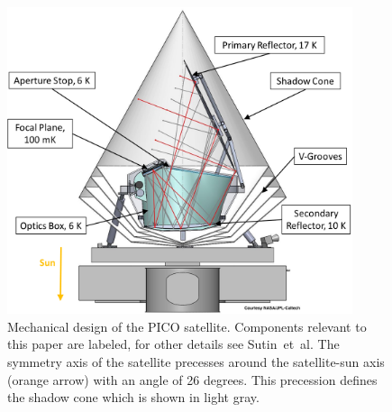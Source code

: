 \documentclass[]{spie}  %
\newcommand{\comb}[1]{\textcolor{blue}{#1}}
\begin{document}
\begin{figure} [ht]
\begin{center}
\includegraphics[height=9cm]{PICO_CAD_annotated.png}
\end{center}
\caption { \label{fig:cad} 
Mechanical design of the PICO satellite. Components relevant to this paper are labeled, for other details see Sutin~et~al.\cite{brian_spie}
The symmetry axis of the satellite precesses around the satellite-sun axis (orange arrow) with an angle of 26 degrees. This precession defines the 
shadow cone which is shown in light gray.
}
\end{figure} 

\end{document}
